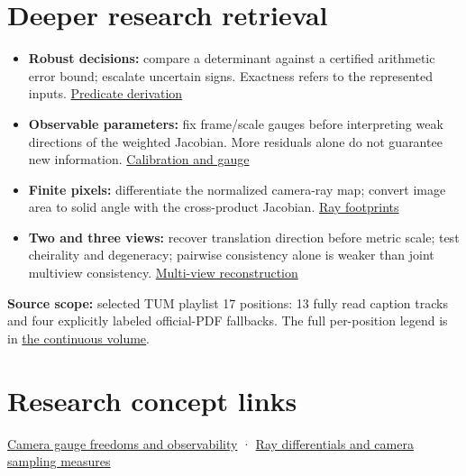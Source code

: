\section{Deeper research retrieval}\label{appendix-a2b71a18f5a2-deeper-research-retrieval}

\begin{itemize}
\tightlist
\item
  \textbf{Robust decisions:} compare a determinant against a certified arithmetic error bound; escalate uncertain signs. Exactness refers to the represented inputs. \href{Continuous\%20Notes/Computing\%20Foundations\%20-\%20From\%20Bits\%20to\%20C++\%20and\%20Systems\%20APIs\#A\%20sign\%20can\%20matter\%20more\%20than\%20a\%20coordinate:\%20robust\%20predicates}{Predicate derivation}
\item
  \textbf{Observable parameters:} fix frame/scale gauges before interpreting weak directions of the weighted Jacobian. More residuals alone do not guarantee new information. \href{Continuous\%20Notes/Computing\%20Foundations\%20-\%20From\%20Bits\%20to\%20C++\%20and\%20Systems\%20APIs\#Calibration\%20needs\%20informative\%20observations\%20and\%20a\%20fixed\%20gauge}{Calibration and gauge}
\item
  \textbf{Finite pixels:} differentiate the normalized camera-ray map; convert image area to solid angle with the cross-product Jacobian. \href{Continuous\%20Notes/Computing\%20Foundations\%20-\%20From\%20Bits\%20to\%20C++\%20and\%20Systems\%20APIs\#A\%20camera\%20ray\%20carries\%20a\%20pixel\%20footprint}{Ray footprints}
\item
  \textbf{Two and three views:} recover translation direction before metric scale; test cheirality and degeneracy; pairwise consistency alone is weaker than joint multiview consistency. \href{Continuous\%20Notes/Computing\%20Foundations\%20-\%20From\%20Bits\%20to\%20C++\%20and\%20Systems\%20APIs\#Calibrated\%20two-view\%20geometry:\%20direction\%20before\%20distance}{Multi-view reconstruction}
\end{itemize}

\textbf{Source scope:} selected TUM playlist 17 positions: 13 fully read caption tracks and four explicitly labeled official-PDF fallbacks. The full per-position legend is in \href{Continuous\%20Notes/Computing\%20Foundations\%20-\%20From\%20Bits\%20to\%20C++\%20and\%20Systems\%20APIs\#External\%20course\%20legend\%20and\%20evidence\%20boundary}{the continuous volume}.

\section{Research concept links}\label{appendix-a2b71a18f5a2-research-concept-links}

\hyperref[appendix-113f0267e5f4]{Camera gauge freedoms and observability} · \hyperref[appendix-8c40fad29462]{Ray differentials and camera sampling measures}
